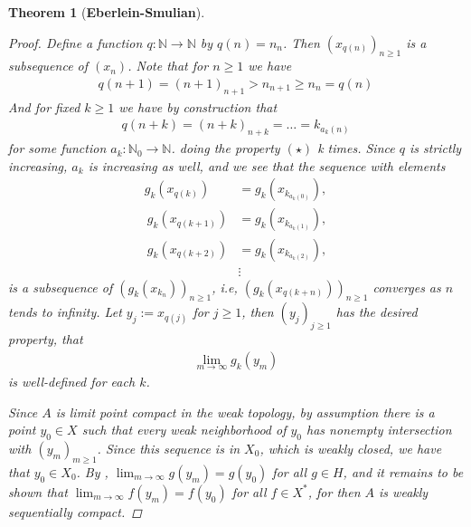 \documentclass[10pt,twoside,openany,final]{memoir}
\theoremstyle{break}
\newtheorem{theorem}[section]{Theorem}
\theoremstyle{Break}
\newcommand{\N}{\mathbb{N}}
\begin{document}
\begin{theorem}[\bfseries{Eberlein-Smulian}]
\begin{proof}
	Define a function $q: \N \to \N$ by $q(n)=n_{n}$. Then $(x_{q(n)})_{n \geq 1}$ is a subsequence of $(x_{n})$. Note that for $n \geq 1$ we have
\begin{align*}
q(n+1)=(n+1)_{n+1}>n_{n+1}\geq n_{n}=q(n)
\end{align*}
And for fixed $k \geq 1$ we have by construction that 
\begin{align*}
q(n+k) =(n+k)_{n+k}=\dots =k_{a_{k}(n)}
\end{align*}
for some function $a_{k} \colon \N_{0} \to \N$. doing the property $(\star)$ k times. Since $q$ is strictly increasing, $a_{k}$ is increasing as well, and we see that the sequence with elements
\begin{align*}
g_{k}(x_{q(k)})&=g_{k}(x_{k_{a_{k}(0)}}), 
\\ \ g_{k}(x_{q(k+1)})&=g_{k}(x_{k_{a_{k}(1)}}), 
\\ \ g_{k}(x_{q(k+2)})&=g_{k}(x_{k_{a_{k}(2)}}), 
\\ &\vdots
\end{align*}
is a subsequence of $(g_{k}(x_{k_{n}}))_{n \geq 1}$, i.e, $(g_{k}(x_{q(k+n)}))_{n \geq 1}$ converges as $n$ tends to infinity. Let $y_{j}:= x_{q(j)}$ for $j \geq 1$, then $(y_{j})_{j \geq 1}$ has the desired property, that
    \begin{align*}
        \lim_{m \to \infty} g_k(y_m)
    \end{align*}
    is well-defined for each $k$.
    
\noindent Since $A$ is limit point compact in the weak topology, by assumption there is a point $y_0 \in X$ such that every weak neighborhood of $y_0$ has nonempty intersection with $(y_m)_{m \geq 1}$. Since this sequence is in $X_0$, which is weakly closed, we have that $y_0 \in X_0$.
    By , $\lim_{m \to \infty} g(y_m) = g(y_0)$ for all $g\in H$, and it remains to be shown that $\lim_{m \to \infty} f(y_m) = f(y_0)$ for all $f \in X^*$, for then $A$ is weakly sequentially compact.
    

\end{proof}
\end{theorem}
\end{document}
